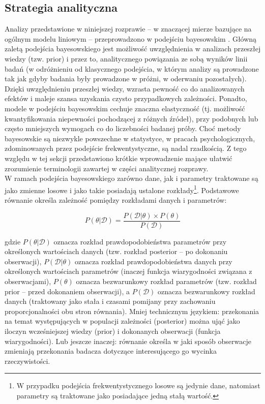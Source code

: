 \documentclass[man]{apa6}
\begin{document}
\subsection{Strategia analityczna}
Analizy przedstawione w niniejszej rozprawie -- w znaczącej mierze bazujące na ogólnym modelu liniowym -- przeprowadzono w podejściu bayesowskim \parencite[zob. np.,][]{gelman2014bayesian,gill2014bayesian, kruschke2014doing}. Główną zaletą podejścia bayesowskiego jest możliwość uwzględnienia w analizach przeszłej wiedzy (tzw. prior) i przez to, analitycznego powiązania ze sobą wyników linii badań (w odróżnieniu od klasycznego podejścia, w którym analizy są prowadzone tak jak gdyby badania były prowadzone w próżni, w oderwaniu pozostałych). Dzięki uwzględnieniu przeszłej wiedzy, wzrasta pewność co do analizowanych efektów i maleje szansa uzyskania czysto przypadkowych zależności. Ponadto, modele w podejściu bayesowskim cechuje znaczna elastyczność (tj. możliwość kwantyfikowania niepewności pochodzącej z różnych źródeł), przy podobnych lub często mniejszych wymogach co do liczebności badanej próby. Choć metody bayesowskie są niezwykle powszechne w statystyce, w pracach psychologicznych, zdominowanych przez podejście frekwentystyczne, są nadal rzadkością. Z tego względu w tej sekcji przedstawiono krótkie wprowadzenie mające ułatwić zrozumienie terminologii zawartej w części analitycznej rozprawy.\\

W ramach podejścia bayesowskiego zarówno dane, jak i parametry traktowane są jako zmienne losowe i jako takie posiadają ustalone rozkłady\footnote{W przypadku podejścia frekwentystycznego losowe są jedynie dane, natomiast parametry są traktowane jako posiadające jedną stałą wartość.}. Podstawowe równanie określa zależność pomiędzy rozkładami danych i parametrów:

\begin{equation}\label{eq:bayes}
    P(\theta | \mathcal{D}) =
    \frac{P(\mathcal{D} | \theta)\times P(\theta)}
    {P(\mathcal{D})}
\end{equation}

gdzie $P(\theta | \mathcal{D})$ oznacza rozkład prawdopodobieństwa parametrów przy określonych wartościach danych (tzw. rozkład posterior -- po dokonaniu obserwacji), $P(\mathcal{D} | \theta)$ oznacza rozkład prawdopodobieństwa danych przy określonych wartościach parametrów (inaczej funkcja wiarygodności związana z obserwacjami), $P(\theta)$ oznacza bezwarunkowy rozkład parametrów (tzw. rozkład prior -- przed dokonaniem obserwacji), a $P(\mathcal{D})$ oznacza bezwarunkowy rozkład danych (traktowany jako stała i czasami pomijany przy zachowaniu proporcjonalności obu stron równania). Mniej technicznym językiem: przekonania na temat występujących w populacji zależności (posterior) można ująć jako iloczyn wcześniejszej wiedzy (prior) i dokonanych obserwacji (funkcja wiarygodności). Lub jeszcze inaczej: równanie określa w jaki sposób obserwacje zmieniają przekonania badacza dotyczące interesującego go
wycinka rzeczywistości. \\
\end{document}
